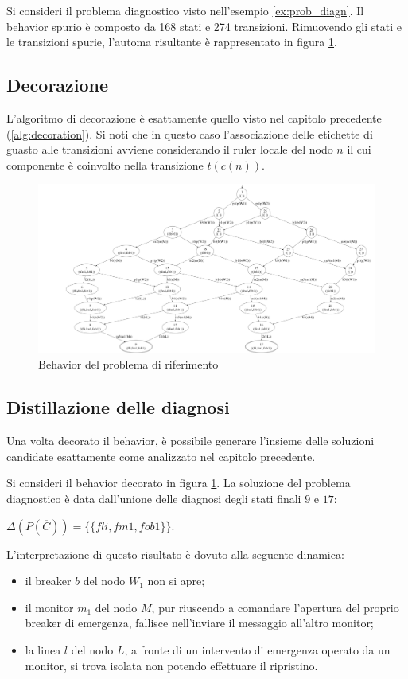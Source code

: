 \begin{ex}
Si consideri il problema diagnostico visto nell'esempio \ref{ex:prob_diagn}. Il behavior spurio è composto da  168 stati e 274 transizioni. Rimuovendo gli stati e le transizioni spurie, l'automa risultante è rappresentato in figura \ref{fig:bhv_c}.
\end{ex}

\subsection{Decorazione}
L'algoritmo di decorazione è esattamente quello visto nel capitolo precedente (\ref{alg:decoration}). Si noti che in questo caso l'associazione delle etichette di guasto alle transizioni avviene considerando il ruler locale del nodo $n$ il cui componente è coinvolto nella transizione $t(c(n))$. 

\begin{figure}[htbp]
\centering
\includegraphics[scale=0.12]{./Img/sac/behavior.png}
\caption{Behavior del problema di riferimento}
\label{fig:bhv_c}
\end{figure}

\subsection{Distillazione delle diagnosi}
Una volta decorato il behavior, è possibile generare l'insieme delle soluzioni candidate esattamente come analizzato nel capitolo precedente.

\begin{ex} \label{ex:soluz}
Si consideri il behavior decorato in figura \ref{fig:bhv_c}. La soluzione del problema diagnostico è data dall'unione delle diagnosi degli stati finali $9$ e $17$:
\begin{center}
$\Delta(P(\overline{C})) = \{\{fli,fm1,fob1\}\}$.
\end{center}
L'interpretazione di questo risultato è dovuto alla seguente dinamica:
\begin{itemize}
\item il breaker $b$ del nodo $W_1$ non si apre;
\item il monitor $m_1$ del nodo $M$, pur riuscendo a comandare l'apertura del proprio breaker di emergenza, fallisce nell'inviare il messaggio all'altro monitor;
\item la linea $l$ del nodo $L$, a fronte di un intervento di emergenza operato da un monitor, si trova isolata non potendo effettuare il ripristino.
\end{itemize}
\end{ex}

